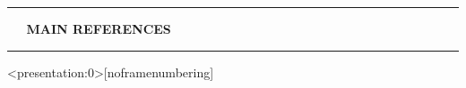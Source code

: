 \documentclass[11pt, compress, t, notes = noshow, xcolor = table, 
aspectratio = 1610]{beamer}
\newcommand{\highlight}[1]{\textcolor{highlightcol}{\textbf{#1}}}
\begin{document}

\LARGE
\begin{frame}{\phantom{foo}}
\normalsize
\vspace{-0.5cm}
\noindent \textcolor{gray!90}{\rule{\textwidth}{1pt}}
\smallskip

\Huge
\hspace{0pt}
\vfill
\textbf{\highlight{~~ MAIN REFERENCES}}
\vfill
\hspace{0pt}

\noindent \textcolor{gray!90}{\rule{\textwidth}{1pt}}

\end{frame}


\begin{frame}<presentation:0>[noframenumbering]

\citep{bengioetal2004}
\citep{ghojoghetal2020}
\citep{cayton2005}
\citep{vandermaatenetal2009}
\citep{sauletal2006}

\end{frame}


\begin{frame}{}
\scriptsize




\end{frame}


\endlecture
\end{document}
